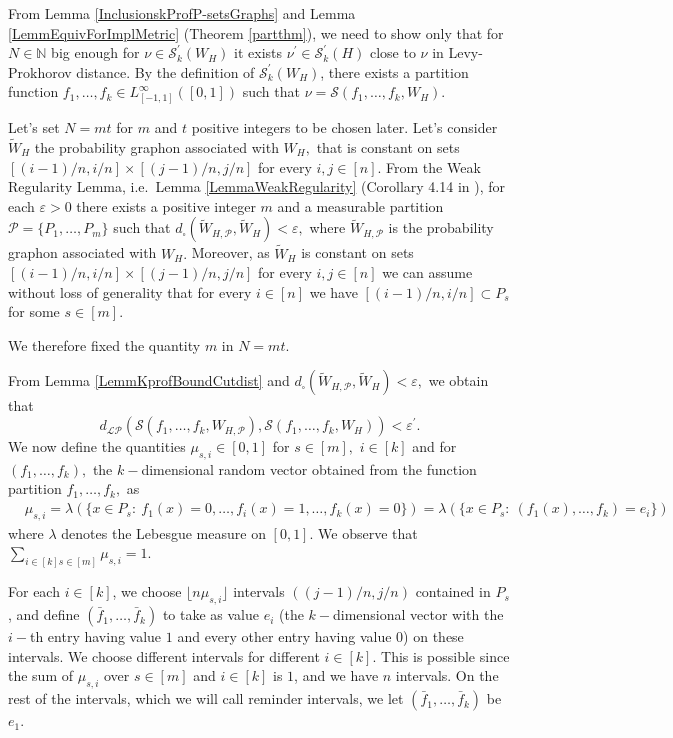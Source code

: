 \documentclass[11pt]{article}
\def\N{\mathbb{N}}
\newcommand{\cP}{{\mathcal P}}  %
\newcommand{\cS}{{\mathcal S}}  %
\begin{document}
From Lemma \ref{InclusionskProfP-setsGraphs} and Lemma \ref{LemmEquivForImplMetric} (Theorem \ref{partthm}), we need to show only that for $N\in \N$ big enough for $\nu\in\mathcal{S}^{\prime}_k(W_H)$ it exists $\nu^{\prime}\in \mathcal{S}^{\prime}_k(H)$ close to $\nu$ in Levy-Prokhorov distance. By the definition of $\mathcal{S}^{\prime}_k(W_H)$, there exists a partition function $f_1,\ldots,f_k\in L_{[-1,1]}^{\infty}([0,1])$ such that $\nu =\mathcal{S}(f_1,\ldots,f_k,W_H).$ 

Let's set $N=m t$ for $m$ and $t $ positive integers to be chosen later. Let's consider $\widetilde W_H$ the probability graphon associated with $W_H,$ that is constant on sets $[(i-1)/n,i/n]\times [(j-1)/n,j/n]$ for every $i,j\in [n].$
From the Weak Regularity Lemma, i.e.\ Lemma \ref{LemmaWeakRegularity} (Corollary 4.14 in \cite{abraham2023probabilitygraphons}), for each $\varepsilon>0$ there exists a positive integer $m$ and a measurable partition $\cP=\{P_1,\ldots, P_m\}$ such that $d_{\square}(\widetilde W_{H,\cP},\widetilde W_{H})<\varepsilon,$ where $\widetilde W_{H,\cP}$ is the probability graphon associated with $W_H.$ Moreover, as $\widetilde W_H$ is constant on sets $[(i-1)/n,i/n]\times [(j-1)/n,j/n]$ for every $i,j\in [n]$ we can assume without loss of generality that for every $i\in [n]$ we have $[(i-1)/n,i/n]\subset P_s$ for some $s\in [m].$

We therefore fixed the quantity $m$ in $N=mt.$

From Lemma \ref{LemmKprofBoundCutdist} and $d_{\square}(\widetilde W_{H,\cP},\widetilde W_{H})<\varepsilon,$ we obtain that $$
d_{\mathcal{LP}}(\cS(f_1,\ldots, f_k,W_{H,\cP}),\cS(f_1,\ldots, f_k,W_{H}))<\varepsilon^{\prime}.
$$
We now define the quantities $\mu_{s,i}\in [0,1]$ for $s\in [m],$ $i\in [k]$ and for $(f_1,\ldots, f_k),$ the $k-$dimensional random vector obtained from the function partition $f_1,\ldots,f_k,$ as  
\begin{equation*}
\begin{aligned}
    & \mu_{s,i}=\lambda(\{x\in P_s:\ f_1(x)=0,\ldots,f_i(x)=1,\ldots, f_k(x)=0\})=\lambda(\{x\in P_s:\ (f_1(x),\ldots, f_k)=e_i\})
\end{aligned}
   \end{equation*}
where $\lambda$ denotes the Lebesgue measure on $[0,1].$ We observe that $\sum_{i\in [k]s\in [m]}\mu_{s,i}=1.$

For each $i\in [k]$, we choose $\lfloor n\mu_{s, i}\rfloor$ intervals $((j-1) / n, j / n)$ contained in $P_s$, and define $(\bar{f}_1, \ldots, \bar{f}_k)$ to take as value $e_i$ (the $k-$dimensional vector with the $i-$th entry having value $1$ and every other entry having value $0$) on these intervals. We choose different intervals for different $i\in [k].$ This is possible since  the sum of $\mu_{s, i}$ over $s\in [m]$ and $i\in [k]$ is $1$, and we have $n$ intervals. On the rest of the intervals, which we will call reminder intervals, we let $\left(\bar{f}_1, \ldots, \bar{f}_k\right)$ be $e_1.$%
\end{document}
